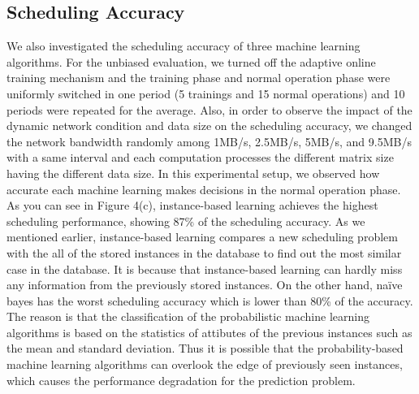 \documentclass[10pt, conference, compsocconf]{IEEEtran}
\begin{document}
{\subsection{Scheduling Accuracy}
%
We also investigated the scheduling accuracy of three machine learning
algorithms.
%
For the unbiased evaluation, we turned off the adaptive online training
mechanism and the training phase and normal operation phase were
uniformly switched in one period (5 trainings and 15 normal operations)
and 10 periods were repeated for the average.
%
Also, in order to observe the impact of the dynamic network condition
and data size on the scheduling accuracy, we changed the network
bandwidth randomly among 1MB/s, 2.5MB/s, 5MB/s, and 9.5MB/s with
a same interval and each computation processes the different matrix size
having the different data size. 
%
In this experimental setup, we observed how accurate each machine
learning makes decisions in the normal operation phase.\\
%
\indent As you can see in Figure 4(c), instance-based learning achieves
the highest scheduling performance, showing 87\% of the scheduling
accuracy.  
%
As we mentioned earlier, instance-based learning compares a new
scheduling problem with the all of the stored instances in the database
to find out the most similar case in the database.
%
It is because that instance-based learning can hardly miss any
information from the previously stored instances.
%
On the other hand, na\"{i}ve bayes has the worst scheduling accuracy
which is lower than 80\% of the accuracy.
%
The reason is that the classification of the probabilistic machine
learning algorithms is based on the statistics of attibutes of the
previous instances such as the mean and standard deviation.
%
Thus it is possible that the probability-based machine learning
algorithms can overlook the edge of previously seen instances, which
causes the performance degradation for the prediction problem.
%
}
\end{document}
